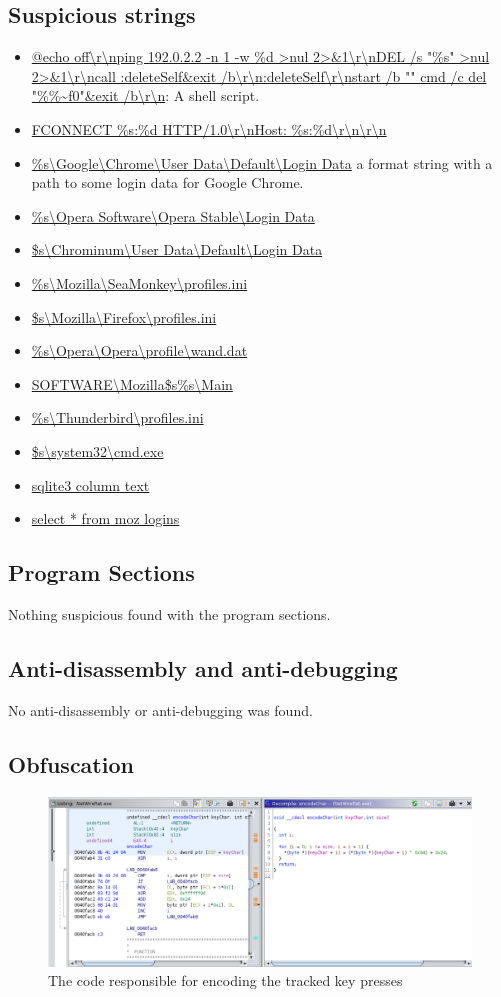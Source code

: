 \documentclass{article}
\begin{document}
    \subsection{Suspicious strings}
    \begin{itemize}
        \item \url{@echo off\r\nping 192.0.2.2 -n 1 -w %d >nul 2>&1\r\nDEL /s "%s" >nul 2>&1\r\ncall :deleteSelf&exit /b\r\n:deleteSelf\r\nstart /b "" cmd /c del "%%~f0"&exit /b\r\n}: A shell script.
        \item \url{FCONNECT %s:%d HTTP/1.0\r\nHost: %s:%d\r\n\r\n}
        \item \url{%s\Google\Chrome\User Data\Default\Login Data} a format string with a path to some login data for Google Chrome.
        \item \url{%s\Opera Software\Opera Stable\Login Data}
        \item \url{$s\Chrominum\User Data\Default\Login Data}
        \item \url{%s\Mozilla\SeaMonkey\profiles.ini}
        \item \url{$s\Mozilla\Firefox\profiles.ini}
        \item \url{%s\Opera\Opera\profile\wand.dat}
        \item \url{SOFTWARE\Mozilla\$s\%s\Main}
        \item \url{%s\Thunderbird\profiles.ini}
        \item \url{$s\system32\cmd.exe}
        \item \url{sqlite3 column text}
        \item \url{select * from moz logins}
    \end{itemize}
    \subsection{Program Sections}
    Nothing suspicious found with the program sections.
    \subsection{Anti-disassembly and anti-debugging}
    No anti-disassembly or anti-debugging was found.
    \subsection{Obfuscation}
    \begin{figure}[H]
        \includegraphics[width=\textwidth]{ghidra-encode.png}
        \caption{The code responsible for encoding the tracked key presses}
        \label{fig:encode}
    \end{figure}
\end{document}
